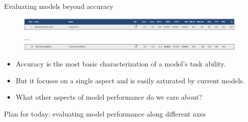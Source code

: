 \documentclass[usenames,dvipsnames,notes,11pt,aspectratio=169,hyperref={colorlinks=true, linkcolor=blue}]{beamer}
\begin{document}
\begin{frame}
    {Evaluating models beyond accuracy}

    \begin{figure}
        \includegraphics[width=\textwidth]{figures/glue-top1}\\[1ex]
        ...\\[1ex]
    \includegraphics[width=\textwidth]{figures/glue-human}
    \end{figure}

    \begin{itemize}
        \item Accuracy is the most basic characterization of a model's task ability.
        \item But it focuses on a single aspect and is easily saturated by current models.
        \item What other aspects of model performance do we care about? 
    \end{itemize}
    \pause
    Plan for today: evaluating model performance along different axes
\end{frame}
\end{document}
